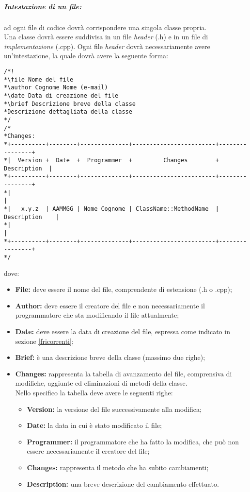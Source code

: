 \subparagraph{Intestazione di un file:}
\label{intestazione}
ad ogni file di codice dovrà corrispondere una singola classe propria.
\\Una classe dovrà essere suddivisa in un file \textit{header} (.h) e in un file di \textit{implementazione} (.cpp).
Ogni file \textit{header} dovrà necessariamente avere un'intestazione, la quale dovrà avere la seguente forma:
\begin{verbatim}
/*!
*\file Nome del file
*\author Cognome Nome (e-mail)
*\date Data di creazione del file
*\brief Descrizione breve della classe
*Descrizione dettagliata della classe
*/
/*
*Changes:
*+----------+--------+--------------+------------------------+----------------+
*|  Version +  Date  +  Programmer  +         Changes        +   Description  |
*+----------+--------+--------------+------------------------+----------------+
*|                                                                            |
*|   x.y.z  | AAMMGG | Nome Cognome | ClassName::MethodName  | Description    |
*|                                                                            |
*+----------+--------+--------------+------------------------+----------------+
*/
\end{verbatim}
dove:
\begin{itemize}
\item\textbf{File:} deve essere il nome del file, comprendente di estensione (.h o .cpp);
\item\textbf{Author:} deve essere il creatore del file e non necessariamente il programmatore che sta modificando il file attualmente;
\item\textbf{Date:} deve essere la data di creazione del file, espressa come indicato in sezione \ref{fricorrenti};
\item\textbf{Brief:} è una descrizione breve della classe (massimo due righe);
\item\textbf{Changes:} rappresenta la tabella di avanzamento del file, comprensiva di modifiche, aggiunte ed eliminazioni di metodi della classe.
\\Nello specifico la tabella deve avere le seguenti righe:
\begin{itemize}
\item\textbf{Version:} la versione del file successivamente alla modifica;
\item\textbf{Date:} la data in cui è stato modificato il file;
\item\textbf{Programmer:} il programmatore che ha fatto la modifica, che può non essere necessariamente il creatore del file;
\item\textbf{Changes:} rappresenta il metodo che ha subito cambiamenti;
\item\textbf{Description:} una breve descrizione del cambiamento effettuato.
\end{itemize}
\end{itemize}

